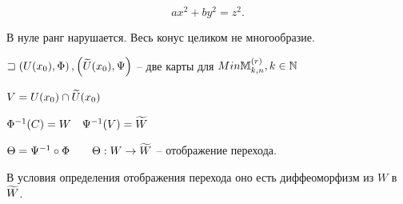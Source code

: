 \begin{example}
    [Конус]

    \[
    ax^2 + by^2 = z^2
    .\]

    В нуле ранг нарушается. Весь конус целиком не многообразие.
\end{example}

$\sqsupset  \left( U(x_0), \Phi \right) , \left( \widetilde{U}(x_0), \Psi  \right) $ -- две карты для $M in \mathbb M_{k, n}^{(r)},k\in \mathbb{N} $

$V = U(x_0) \cap \widetilde{U}(x_0)$

$\Phi^{-1}(C) = W\quad \Psi^{-1}(V) = \widetilde{W}$

$\Theta = \Psi^{-1} \circ \Phi\qquad \Theta: W \to \widetilde{W}$ -- отображение перехода.

\begin{statement}
    В условия определения отображения перехода оно есть диффеоморфизм из $W$ в $\widetilde{W}$.
\end{statement}

